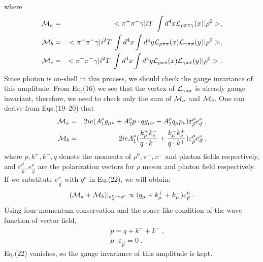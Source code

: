 where
\begin{eqnarray}
{\cal M}_a&=&<\pi^+\pi^-\gamma\vert 
iT\;\int d^4 x {\cal L}_{\rho\pi\pi\gamma}(x)\vert \rho^0 > ,\\
{\cal M}_b&=&<\pi^+\pi^-\gamma\vert i^2T\;\int d^4 x\int d^4
y{\cal L}_{\rho\pi\pi}(x){\cal L}_{\gamma\pi\pi}(y)\vert \rho^0 > ,\\
{\cal M}_c&=&<\pi^+\pi^-\gamma\vert i^2T\;\int d^4 x\int d^4
y{\cal L}_{\rho a\pi}(x){\cal L}_{\gamma a\pi}(y)\vert \rho^0 >. 
\end{eqnarray}
Since photon is on-shell in this process, we should check the gauge
invariance of this amplitude. From Eq.(16) we see that 
the vertex of ${\cal L}_{\gamma a \pi}$ is already gauge invariant,
therefore, we need to check only the sum of ${\cal M}_a$ and ${\cal M}_b$. 
One can derive from Eqs.(19--20) that
\begin{eqnarray}
{\cal M}_a&=&2ie(A_1^\rho g_{\mu\nu}+A_2^\rho p\cdot q g_{\mu\nu}
-A_2^\rho q_\mu p_\nu) \varepsilon^{\mu}_{\vec p}e^{\nu}_{\vec q}\;,
\nonumber \\
{\cal M}_b&=&2ieA_1^\rho (\frac{k_{\mu}^+ k_{\nu}^-} {q \cdot k^-}+
\frac{k_{\mu}^- k_{\nu}^+} {q \cdot k^+})  \varepsilon^{\mu}_{\vec
p}e^{\nu}_{\vec q}\;, 
\end{eqnarray}   
where $p,k^+,k^-,q$
denote the momenta of $\rho^0,\pi^+,\pi^-$ and photon fields respectively, 
and $\varepsilon^{\mu}_{\vec p}, e^{\nu}_{\vec q}$ are the polarization
vectors for $\rho$ meson and photon field respectively.
If we substitute $e^{\nu}_{\vec q}$ with $q^\nu$ in Eq.(22), we will
obtain:
\begin{eqnarray}
({\cal M}_a+{\cal M}_b){\vert}_{e^{\nu}_{\vec q} \rightarrow q^\nu}\propto
(q_\mu+k^+_\mu+k^-_\mu)\varepsilon^{\mu}_{\vec p}{\;}.
\end{eqnarray}  
Using four-momentum conservation and the space-like condition of
the wave function of vector field, 
\begin{eqnarray}
& &p=q+k^+ + k^- {\;},\nonumber\\
& &p\cdot \varepsilon_{\vec p}=0{\;}.
\end{eqnarray}
Eq.(22) vanishes, so the gauge invariance of this amplitude is kept.

